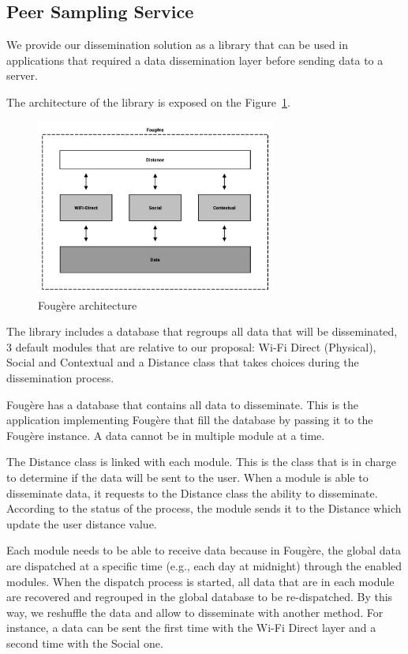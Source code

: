 \subsection{Peer Sampling Service}

We provide our dissemination solution as a library that can be used in applications that required a data dissemination layer before sending data to a server.

The architecture of the library is exposed on the Figure~\ref{Fougere}.

\begin{figure}[h]
	\centering
	\includegraphics[width=0.7\textwidth]{figures/fougere}
	\caption{\label{Fougere} Foug\`ere architecture}
\end{figure}

The library includes a database that regroups all data that will be disseminated, 3 default modules that are relative to our proposal: Wi-Fi Direct (Physical), Social and Contextual and a Distance class that takes choices during the dissemination process.

Foug\`ere has a database that contains all data to disseminate.
This is the application implementing Foug\`ere that fill the database by passing it to the Foug\`ere instance.
A data cannot be in multiple module at a time.

The Distance class is linked with each module.
This is the class that is in charge to determine if the data will be sent to the user.
When a module is able to disseminate data, it requests to the Distance class the ability to disseminate.
According to the status of the process, the module sends it to the Distance which update the user distance value.

Each module needs to be able to receive data because in Foug\`ere, the global data are dispatched at a specific time (e.g., each day at midnight) through the enabled modules.
When the dispatch process is started, all data that are in each module are recovered and regrouped in the global database to be re-dispatched.
By this way, we reshuffle the data and allow to disseminate with another method.
For instance, a data can be sent the first time with the Wi-Fi Direct layer and a second time with the Social one.

